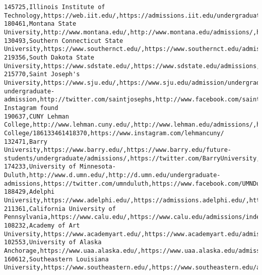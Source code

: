 \documentclass[11pt]{article}
\begin{document}
\begin{Verbatim}[commandchars=\\\{\}]
145725,Illinois Institute of Technology,https://web.iit.edu/,https://admissions.iit.edu/undergraduate,https://twitter.com/IITUGadmission,https://www.facebook.com/TalonTheScarletHawk/,https://instagram.com/IllinoisTech/
180461,Montana State University,http://www.montana.edu/,http://www.montana.edu/admissions/,https://twitter.com/montanastate,https://www.facebook.com/montanastate,https://www.instagram.com/p/BfTj5M7h9y4/
130493,Southern Connecticut State University,https://www.southernct.edu/,https://www.southernct.edu/admissions/,https://twitter.com/scsu,https://www.facebook.com/southernct,https://instagram.com/scsugram
219356,South Dakota State University,https://www.sdstate.edu/,https://www.sdstate.edu/admissions,http://twitter.com/sdstate,http://www.facebook.com/SouthDakotaStateUniversity,http://instagram.com/sdstatepics
215770,Saint Joseph's University,https://www.sju.edu/,https://www.sju.edu/admission/undergraduate/apply-undergraduate-admission,http://twitter.com/saintjosephs,http://www.facebook.com/saintjosephsuniversity,No Instagram found
190637,CUNY Lehman College,http://www.lehman.cuny.edu/,http://www.lehman.edu/admissions/,https://twitter.com/@LehmanCollege,https://www.facebook.com/pages/Lehman-College/186133461418370,https://www.instagram.com/lehmancuny/
132471,Barry University,https://www.barry.edu/,https://www.barry.edu/future-students/undergraduate/admissions/,https://twitter.com/BarryUniversity,https://www.facebook.com/barryuniversity,http://instagram.com/barryuniversity
174233,University of Minnesota-Duluth,http://www.d.umn.edu/,http://d.umn.edu/undergraduate-admissions,https://twitter.com/umnduluth,https://www.facebook.com/UMNDuluth,https://www.instagram.com/p/BpUXu5LFf97/
188429,Adelphi University,https://www.adelphi.edu/,https://admissions.adelphi.edu/,http://twitter.com/AdelphiU,http://www.facebook.com/AdelphiU,http://instagram.com/adelphiu
211361,California University of Pennsylvania,https://www.calu.edu/,https://www.calu.edu/admissions/index.aspx,https://twitter.com/CalUofPA,https://www.facebook.com/CalUofPA/,https://www.instagram.com/caluofpa/
108232,Academy of Art University,https://www.academyart.edu/,https://www.academyart.edu/admissions/,https://twitter.com/academy\_of\_art/,https://www.facebook.com/AcademyofArtUniversity,https://www.instagram.com/academy\_of\_art/
102553,University of Alaska Anchorage,https://www.uaa.alaska.edu/,https://www.uaa.alaska.edu/admissions/,//twitter.com/uaanchorage,//www.facebook.com/UAAnchorage,//instagram.com/uaaphotos/
160612,Southeastern Louisiana University,https://www.southeastern.edu/,https://www.southeastern.edu/admin/admissions/index.html,https://twitter.com/oursoutheastern,https://www.facebook.com/southeastern,http://instagram.com/oursoutheastern

\end{Verbatim}
\end{document}
